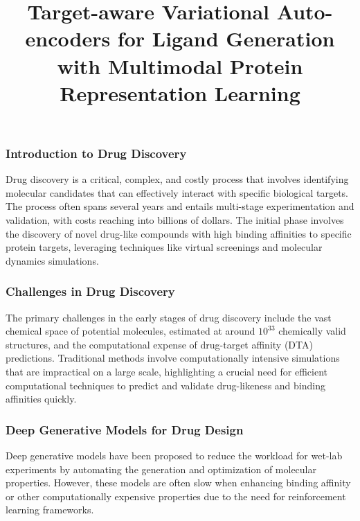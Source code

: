 \documentclass[11pt,xcolor={dvipsnames},hyperref={pdftex,pdfpagemode=UseNone,hidelinks,pdfdisplaydoctitle=true},usepdftitle=false]{beamer}
\begin{document}
\title{Target-aware Variational Auto-encoders for Ligand Generation with Multimodal Protein Representation Learning}
%
\frame{\titlepage}

\begin{frame}
    \frametitle{Introduction to Drug Discovery}
    Drug discovery is a critical, complex, and costly process that involves identifying molecular candidates that can effectively interact with specific biological targets. The process often spans several years and entails multi-stage experimentation and validation, with costs reaching into billions of dollars. The initial phase involves the discovery of novel drug-like compounds with high binding affinities to specific protein targets, leveraging techniques like virtual screenings and molecular dynamics simulations.
\end{frame}
    
\begin{frame}
    \frametitle{Challenges in Drug Discovery}
    The primary challenges in the early stages of drug discovery include the vast chemical space of potential molecules, estimated at around $10^{33}$ chemically valid structures, and the computational expense of drug-target affinity (DTA) predictions. Traditional methods involve computationally intensive simulations that are impractical on a large scale, highlighting a crucial need for efficient computational techniques to predict and validate drug-likeness and binding affinities quickly.
\end{frame}
    
\begin{frame}
    \frametitle{Deep Generative Models for Drug Design}
    Deep generative models have been proposed to reduce the workload for wet-lab experiments by automating the generation and optimization of molecular properties. However, these models are often slow when enhancing binding affinity or other computationally expensive properties due to the need for reinforcement learning frameworks.
    
\end{frame}
\end{document}
